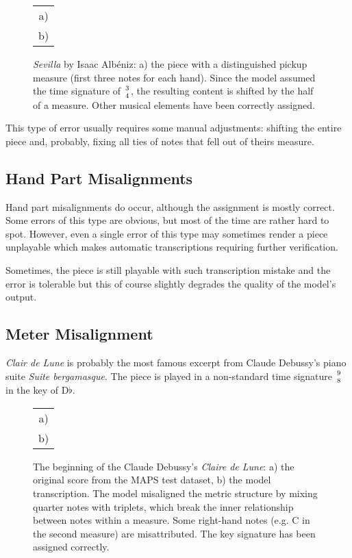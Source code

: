 \begin{figure}[ht!]
\centering
\begin{tabular}{c}a)
 \\ b)

\end{tabular}
\caption[\emph{Sevilla} by Isaac Albéniz.]{\emph{Sevilla} by Isaac Albéniz: a) the piece with a distinguished pickup measure (first three notes for each hand). Since the model assumed the time signature of ${3 \atop 4}$, the resulting content is shifted by the half of a measure. Other musical elements have been correctly assigned.}
\label{albeniz}
\end{figure}

This type of error usually requires some manual adjustments: shifting the entire piece and, probably, fixing all ties of notes that fell out of theirs measure.

\subsection{Hand Part Misalignments}

Hand part misalignments do occur, although the assignment is mostly correct. Some errors of this type are obvious, but most of the time are rather hard to spot. However, even a single error of this type may sometimes render a piece unplayable which makes automatic transcriptions requiring further verification. 

Sometimes, the piece is still playable with such transcription mistake and the error is tolerable but this of course slightly degrades the quality of the model's output.

\subsection{Meter Misalignment}\label{meter_misalignment}

\emph{Clair de Lune} is probably the most famous excerpt from Claude Debussy's piano suite \emph{Suite bergamasque}. The piece is played in a non-standard time signature ${9 \atop 8}$ in the key of D$\flat$.

\begin{figure}[ht!]
\centering
\begin{tabular}{c}a)
 \\ b)

\end{tabular}
\caption[Claude Debussy's \emph{Claire de Lune}.]{The beginning of the Claude Debussy's \emph{Claire de Lune}: a) the original score from the MAPS test dataset, b) the model transcription. The model misaligned the metric structure by mixing quarter notes with triplets, which break the inner relationship between notes within a measure. Some right-hand notes (e.g. C in the second measure) are misattributed. The key signature has been assigned correctly.}
\label{claire_de_lune}
\end{figure}

